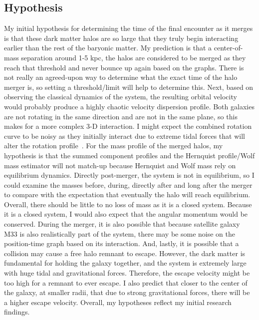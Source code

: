 \documentclass[linenumbers,trackchanges]{aastex7}
\begin{document}
\subsection{Hypothesis}
My initial hypothesis for determining the time of the final encounter as it merges is that these dark matter halos are so large that they truly begin interacting earlier than the rest of the baryonic matter. My prediction is that a center-of-mass separation around 1-5 kpc, the halos are considered to be merged as they reach that threshold and never bounce up again based on the graphs. There is not really an agreed-upon way to determine what the exact time of the halo merger is, so setting a threshold/limit will help to determine this. Next, based on observing the classical dynamics of the system, the resulting orbital velocity would probably produce a highly chaotic velocity dispersion profile. Both galaxies are not rotating in the same direction and are not in the same plane, so this makes for a more complex 3-D interaction. I might expect the combined rotation curve to be noisy as they initially interact due to extreme tidal forces that will alter the rotation profile~\citep{Dubinski1992ApJ401}. For the mass profile of the merged halos, my hypothesis is that the summed component profiles and the Hernquist profile/Wolf mass estimator will not match-up because Hernquist and Wolf mass rely on equilibrium dynamics. Directly post-merger, the system is not in equilibrium, so I could examine the masses before, during, directly after and long after the merger to compare with the expectation that eventually the halo will reach equilibrium. Overall, there should be little to no loss of mass as it is a closed system. Because it is a closed system, I would also expect that the angular momentum would be conserved. During the merger, it is also possible that because satellite galaxy M33 is also realistically part of the system, there may be some noise on the position-time graph based on its interaction. And, lastly, it is possible that a collision may cause a free halo remnant to escape. However, the dark matter is fundamental for holding the galaxy together, and the system is extremely large with huge tidal and gravitational forces. Therefore, the escape velocity might be too high for a remnant to ever escape. I also predict that closer to the center of the galaxy, at smaller radii, that due to strong gravitational forces, there will be a higher escape velocity. Overall, my hypotheses reflect my initial research findings.




\end{document}

